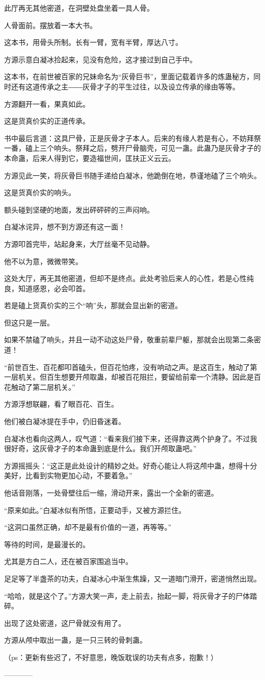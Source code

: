\begin{this_body}
此厅再无其他密道，在洞壁处盘坐着一具人骨。

人骨面前。摆放着一本大书。

这本书，用骨头所制。长有一臂，宽有半臂，厚达八寸。

方源示意白凝冰捡起来，见没有危险，这才接过到自己手中。

这本书，在前世被百家的兄妹命名为“灰骨巨书”，里面记载着许多的炼蛊秘方，同时还有这道传承之主――灰骨才子的平生过往，以及设立传承的缘由等等。

方源翻开一看，果真如此。

这是货真价实的正道传承。

书中最后言道：这具尸骨，正是灰骨才子本人。后来的有缘人若是有心，不妨拜祭一番，磕上三个响头。祭拜之后，劈开尸骨脑壳，可见一蛊。此蛊乃是灰骨才子的本命蛊，后来人得到它，要造福世间，匡扶正义云云。

方源见此一笑，将灰骨巨书随手递给白凝冰，他跪倒在地，恭谨地磕了三个响头。

这是货真价实的响头。

额头碰到坚硬的地面，发出砰砰砰的三声闷响。

白凝冰诧异，想不到方源还有这一面！

方源叩首完毕，站起身来，大厅丝毫不见动静。

他不以为意，微微带笑。

这处大厅，再无其他密道，但却不是终点。此处考验后来人的心性，若是心性纯良，知道感恩，必会叩首。

若是磕上货真价实的三个“响”头，那就会显出新的密道。

但这只是一层。

如果不禁磕了响头，并且一动不动这处尸骨，敬重前辈尸躯，那就会出现第二条密道！

“前世百生、百花都叩首磕头，但百花怕疼，没有响动之声。是这百生，触动了第一层机关。但百生想要开颅取蛊，却被百花阻拦，要留给前辈一个清静。因此是百花触动了第二层机关。”

方源浮想联翩，看了眼百花、百生。

他们被白凝冰提在手中，仍旧昏迷着。

白凝冰也看向这两人，叹气道：“看来我们接下来，还得靠这两个护身了。不过我很好奇，这灰骨才子的本命蛊到底是什么。我们开颅取蛊吧。”

方源摇摇头：“这正是此处设计的精妙之处。好奇心能让人将这颅中蛊，想得十分美好，比看到实物更加心动，不要着急。”

他话音刚落，一处骨壁往后一缩，滑动开来，露出一个全新的密道。

“原来如此。”白凝冰似有所悟，正要动手，又被方源拦住。

“这洞口虽然正确，却不是最有价值的一道，再等等。”

等待的时间，是最漫长的。

尤其是方白二人，还在被百家围追当中。

足足等了半盏茶的功夫，白凝冰心中渐生焦躁，又一道暗门滑开，密道悄然出现。

“哈哈，就是这个了。”方源大笑一声，走上前去，抬起一脚，将灰骨才子的尸体踏碎。

出现了这处密道，这尸骨就没有用了。

方源从颅中取出一蛊，是一只三转的骨刺蛊。

（ps：更新有些迟了，不好意思，晚饭耽误的功夫有点多，抱歉！）

------------

\end{this_body}

